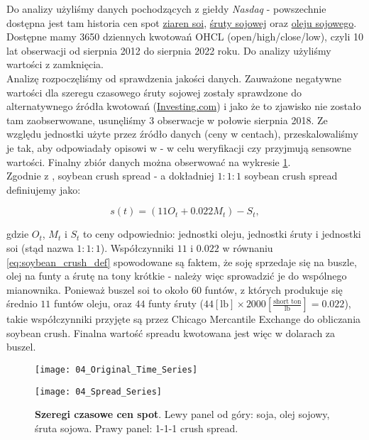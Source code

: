 Do analizy użyliśmy danych pochodzących z giełdy \emph{Nasdaq} - powszechnie dostępna jest tam historia cen spot \href{https://www.nasdaq.com/market-activity/commodities/zs/historical}{ziaren soi},  \href{https://www.nasdaq.com/market-activity/commodities/zm/historical}{śruty sojowej} oraz \href{https://www.nasdaq.com/market-activity/commodities/zl/historical}{oleju sojowego}. Dostępne mamy 3650 dziennych kwotowań OHCL (open/high/close/low), czyli 10 lat obserwacji od sierpnia 2012 do sierpnia 2022 roku. Do analizy użyliśmy wartości z zamknięcia.\\

Analizę rozpoczęliśmy od sprawdzenia jakości danych. Zauważone negatywne wartości dla szeregu czasowego śruty sojowej zostały sprawdzone do alternatywnego źródła kwotowań (\href{https://www.investing.com/commodities/us-soybean-meal-historical-data}{Investing.com}) i jako że to zjawisko nie zostało tam zaobserwowane, usunęliśmy 3 obserwacje w połowie sierpnia 2018. Ze względu jednostki użyte przez źródło danych (ceny w centach), przeskalowaliśmy je tak, aby odpowiadały opisowi w \cite{CME_soybean} - w celu weryfikacji czy przyjmują sensowne wartości. Finalny zbiór danych można obserwować na wykresie \ref{fig:original_time_series}.\\

Zgodnie z \cite{CME_soybean}, soybean crush spread - a dokładniej $1\colon1\colon1$ soybean crush spread definiujemy jako:

\begin{equation}
	s(t) = (11 O_t + 0.022 M_t) - S_t,
	\label{eq:soybean_crush_def}
\end{equation}

gdzie $O_t$, $M_t$ i $S_t$ to ceny odpowiednio: jednostki oleju, jednostki śruty i jednostki soi (stąd nazwa $1\colon1\colon1$). Współczynniki $11$ i $0.022$ w równaniu \ref{eq:soybean_crush_def} spowodowane są faktem, że soję sprzedaje się na buszle, olej na funty a śrutę na tony krótkie - należy więc sprowadzić je do wspólnego mianownika. Ponieważ buszel soi to około $60$ funtów, z których produkuje się średnio $11$ funtów oleju, oraz $44$ funty śruty ($44[\text{lb}]\times 2000[\frac{\text{short ton}}{\text{lb}}] = 0.022$), takie współczynniki przyjęte są przez Chicago Mercantile Exchange do obliczania soybean crush. Finalna wartość spreadu kwotowana jest więc w dolarach za buszel.

\begin{figure}[h]
	\centering
	\begin{minipage}{0.45\linewidth}
	\texttt{[image: 04\_Original\_Time\_Series]}
	\end{minipage}
	\begin{minipage}{0.45\linewidth}
	\texttt{[image: 04\_Spread\_Series]}
	\end{minipage}
	\caption{\textbf{Szeregi czasowe cen spot}. Lewy panel od góry: soja, olej sojowy, śruta sojowa. Prawy panel: 1-1-1 crush spread. \label{fig:original_time_series}}
\end{figure}

